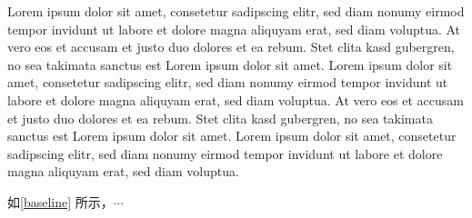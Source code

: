 \documentclass[]{WTUthesis}
\begin{document}
	Lorem ipsum dolor sit amet, consetetur sadipscing elitr, sed diam nonumy eirmod tempor invidunt ut labore et dolore magna aliquyam erat, sed diam voluptua. At vero eos et accusam et justo duo dolores et ea rebum. Stet clita kasd gubergren, no sea takimata sanctus est Lorem ipsum dolor sit amet. Lorem ipsum dolor sit amet, consetetur sadipscing elitr, sed diam nonumy eirmod tempor invidunt ut labore et dolore magna aliquyam erat, sed diam voluptua. At vero eos et accusam et justo duo dolores et ea rebum. Stet clita kasd gubergren, no sea takimata sanctus est Lorem ipsum dolor sit amet. Lorem ipsum dolor sit amet, consetetur sadipscing elitr, sed diam nonumy eirmod tempor invidunt ut labore et dolore magna aliquyam erat, sed diam voluptua.
	
	如\cref{baseline} 所示，$\cdots$
	
\end{document}

